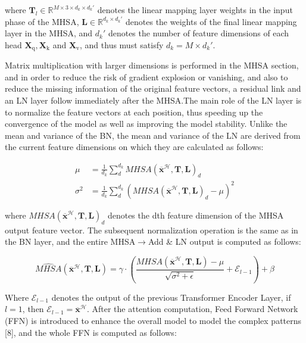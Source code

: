 where $\mathbf{T}_l \in \mathbb{R}^{M\times 3\times d_k\times d_k' }$ denotes the linear mapping layer weights in the input phase of the MHSA, $\mathbf{L} \in \mathbb{R}^{d_k\times d_k' }$ denotes the weights of the final linear mapping layer in the MHSA, and $d_k'$ denotes the number of feature dimensions of each head $\boldsymbol{X}_\text{q}, \boldsymbol{X}_\text{k}$ and $\boldsymbol{X}_\text{v}$, and thus must satisfy $d_k=M\times d_k'$.

Matrix multiplication with larger dimensions is performed in the MHSA section, and in order to reduce the risk of gradient explosion or vanishing, and also to reduce the missing information of the original feature vectors, a residual link and an LN layer follow immediately after the MHSA.The main role of the LN layer is to normalize the feature vectors at each position, thus speeding up the convergence of the model as well as improving the model stability. Unlike the mean and variance of the BN, the mean and variance of the LN are derived from the current feature dimensions on which they are calculated as follows:

\begin{equation}
\label{eq8}
\begin{aligned}
  \mu &= \frac{1}{d_k}\sum^{d_k}_d MHSA(\overline{\boldsymbol{x}}^\mathcal{H}, \mathbf{T}, \mathbf{L})_d \\
  \sigma^2 &= \frac{1}{d_k}\sum^{d_k}_d \left( MHSA(\overline{\boldsymbol{x}}^\mathcal{H}, \mathbf{T}, \mathbf{L})_d - \mu \right)^2
\end{aligned}
\end{equation}

where $MHSA(\overline{\boldsymbol{x}}^\mathcal{H},\mathbf{T},\mathbf{L})_d$ denotes the dth feature dimension of the MHSA output feature vector. The subsequent normalization operation is the same as in the BN layer, and the entire MHSA$\to$Add \& LN output is computed as follows:

\begin{equation}
\label{eq9}
  \hat{MHSA}(\overline{\boldsymbol{x}}^\mathcal{H}, \mathbf{T}, \mathbf{L}) = \gamma \cdot \left( \frac{MHSA(\overline{\boldsymbol{x}}^\mathcal{H}, \mathbf{T}, \mathbf{L}) - \mu}{\sqrt{\sigma^2+\epsilon}} + \mathcal{E}_{l-1} \right) + \beta
\end{equation}

Where $\mathcal{E}_{l-1}$ denotes the output of the previous Transformer Encoder Layer, if $l=1$, then $\mathcal{E}_{l-1}=\overline{\boldsymbol{x}}^\mathcal{H}$. After the attention computation, Feed Forward Network (FFN) is introduced to enhance the overall model to model the complex patterns [8], and the whole FFN is computed as follows:

